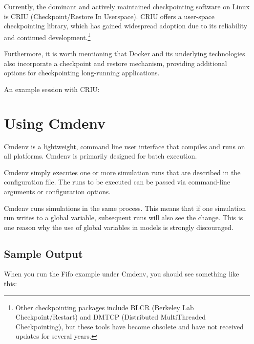 Currently, the dominant and actively maintained checkpointing software on Linux
is CRIU (Checkpoint/Restore In Userspace). CRIU offers a user-space
checkpointing library, which has gained widespread adoption due to its
reliability and continued development.\footnote{Other checkpointing packages
include BLCR (Berkeley Lab Checkpoint/Restart) and DMTCP (Distributed
MultiThreaded Checkpointing), but these tools have become obsolete and have not
received updates for several years.}

Furthermore, it is worth mentioning that Docker and its underlying technologies
also incorporate a checkpoint and restore mechanism, providing additional
options for checkpointing long-running applications.

An example session with CRIU:



\section{Using Cmdenv}
\label{sec:run-sim:cmdenv}

Cmdenv is a lightweight, command line user interface that
compiles and runs on all platforms. Cmdenv is primarily designed for batch
execution.

Cmdenv simply executes one or more simulation runs that are described
in the configuration file. The runs to be executed can be
passed via command-line arguments or configuration options.

Cmdenv runs simulations in the same process. This means that if one
simulation run writes to a global variable, subsequent runs will also
see the change. This is one reason why the use of global variables in models is
strongly discouraged.

\subsection{Sample Output}
\label{sec:run-sim:cmdenv:sample-output}

When you run the Fifo example under Cmdenv, you should see
something like this:

